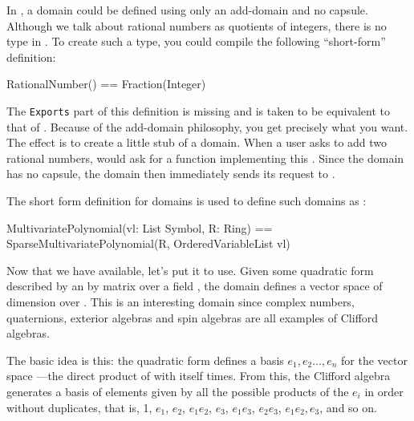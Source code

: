 {{{{{{{%
%
In \Language{}, a domain could be defined using only an add-domain
and no capsule.
Although we talk about rational numbers as quotients of integers,
there is no type  in \Language{}.
To create such a type, you could compile the following
``short-form'' definition:

\begin{xmpLines}
RationalNumber() == Fraction(Integer)
\end{xmpLines}

The {\tt Exports} part of this definition is missing and is taken
to be equivalent to that of .
Because of the add-domain philosophy, you get precisely
what you want.
The effect is to create a little stub of a domain.
When a user asks to add two rational numbers, \Language{} would
ask  for a function implementing this
\spadop{+}.
Since the domain has no capsule, the domain then immediately
sends its request to .

The short form definition for domains is used to
define such domains as :

\begin{xmpLines}
MultivariatePolynomial(vl: List Symbol, R: Ring) ==
   SparseMultivariatePolynomial(R,
      OrderedVariableList vl)
\end{xmpLines}

%

Now that we have  available,
let's put it to use.
Given some quadratic form  described by an
 by  matrix over a field , the domain
 defines a vector space of
dimension  over .
This is an interesting domain since complex numbers, quaternions,
exterior algebras and spin algebras are all examples of Clifford
algebras.

The basic idea is this:
the quadratic form  defines a basis
$e_1,e_2\ldots,e_n$ for the
vector space ---the direct product of 
with itself  times.
From this, the Clifford algebra generates a basis of
 elements given by all the possible products
of the $e_i$ in order without duplicates, that is,
1,
$e_1$,
$e_2$,
$e_1e_2$,
$e_3$,
$e_1e_3$,
$e_2e_3$,
$e_1e_2,e_3$,
and so on.

}}}}}}}
